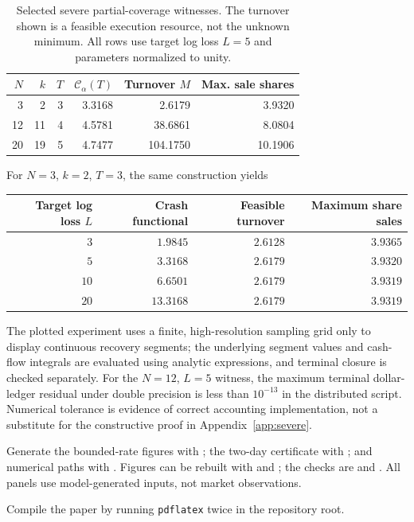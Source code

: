 \documentclass[11pt]{article}
\numberwithin{equation}{section}
\theoremstyle{definition}
\theoremstyle{remark}
\begin{document}
\begin{table}[H]\centering\small
\caption{Selected severe partial-coverage witnesses. The turnover shown is a feasible execution resource, not the unknown minimum. All rows use target log loss $L=5$ and parameters normalized to unity.}\label{tab:witness}
\begin{tabular}{@{}rrrrrr@{}}\toprule
$N$ & $k$ & $T$ & $\mathcal C_\alpha(T)$ & Turnover $M$ & Max. sale shares \\\midrule
3 & 2 & 3 & 3.3168 & 2.6179 & 3.9320\\
12 & 11 & 4 & 4.5781 & 38.6861 & 8.0804\\
20 & 19 & 5 & 4.7477 & 104.1750 & 10.1906\\
\bottomrule\end{tabular}
\end{table}


For $N=3$, $k=2$, $T=3$, the same construction yields
\begin{center}\small
\begin{tabular}{@{}rrrr@{}}\toprule
Target log loss $L$ & Crash functional & Feasible turnover & Maximum share sales\\\midrule
$3$ & $1.9845$ & $2.6128$ & $3.9365$\\
 $5$ & $3.3168$ & $2.6179$ & $3.9320$\\
$10$ & $6.6501$ & $2.6179$ & $3.9319$\\
$20$ & $13.3168$ & $2.6179$ & $3.9319$\\
\bottomrule\end{tabular}
\end{center}
The plotted experiment uses a finite, high-resolution sampling grid only to display continuous recovery segments; the underlying segment values and cash-flow integrals are evaluated using analytic expressions, and terminal closure is checked separately. For the $N=12$, $L=5$ witness, the maximum terminal dollar-ledger residual under double precision is less than $10^{-13}$ in the distributed script. Numerical tolerance is evidence of correct accounting implementation, not a substitute for the constructive proof in Appendix~\ref{app:severe}.

\begingroup\sloppy
Generate the bounded-rate figures with ; the two-day certificate with ; and numerical paths with .
Figures can be rebuilt with  and ; the checks are  and .
All panels use model-generated inputs, not market observations.\par\endgroup
Compile the paper by running \texttt{pdflatex} twice in the repository root.
\end{document}
